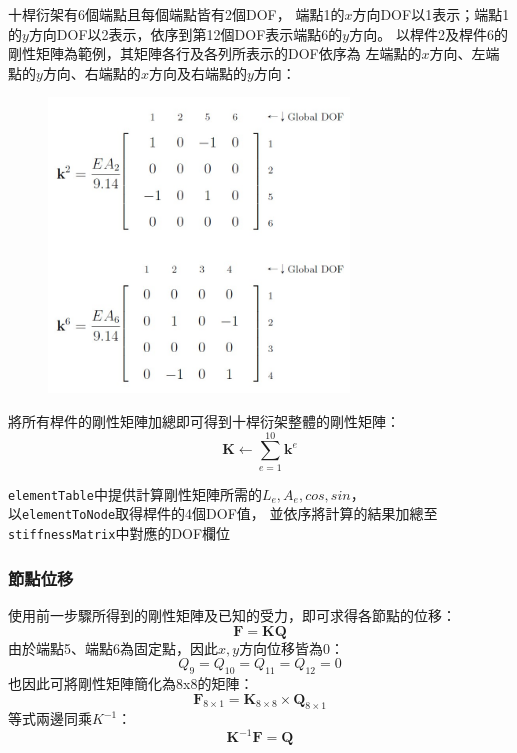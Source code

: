 \documentclass[12pt,a4paper]{article}
\begin{document}
            十桿衍架有6個端點且每個端點皆有2個DOF，
            端點1的$x$方向DOF以1表示；端點1的$y$方向DOF以2表示，依序到第12個DOF表示端點6的$y$方向。
            以桿件2及桿件6的剛性矩陣為範例，其矩陣各行及各列所表示的DOF依序為
            左端點的$x$方向、左端點的$y$方向、右端點的$x$方向及右端點的$y$方向：
            \begin{figure}[h]
                \centering
                \includegraphics[width=8cm]{Stiffness_matrix_GlobalDOF}
            \end{figure}

            將所有桿件的剛性矩陣加總即可得到十桿衍架整體的剛性矩陣：
            \begin{displaymath}
                \mathbf{K} \leftarrow \sum_{e=1}^{10} \mathbf{k}^e
            \end{displaymath}

            \texttt{elementTable}中提供計算剛性矩陣所需的$L_e,A_e,cos,sin$，\\
            以\texttt{elementToNode}取得桿件的4個DOF值，
            並依序將計算的結果加總至\texttt{stiffnessMatrix}中對應的DOF欄位
            
        
        \newpage
        \subsubsection{節點位移}

            使用前一步驟所得到的剛性矩陣及已知的受力，即可求得各節點的位移：
            \begin{displaymath}
                \mathbf{F} = \mathbf{K}\mathbf{Q}
            \end{displaymath}
            由於端點5、端點6為固定點，因此$x,y$方向位移皆為0：
            \begin{displaymath}
                Q_9=Q_{10}=Q_{11}=Q_{12}=0
            \end{displaymath}
            也因此可將剛性矩陣簡化為8x8的矩陣：
            \begin{displaymath}
                \mathbf{F}_{8\times1} = \mathbf{K}_{8\times8}\times\mathbf{Q}_{8\times1}
            \end{displaymath}
            等式兩邊同乘$K^{-1}$：
            \begin{displaymath}
                \mathbf{K}^{-1}\mathbf{F} = \mathbf{Q}
            \end{displaymath}
\end{document}
